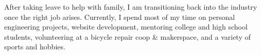\vspace{1ex}
\hfill\begin{minipage}{\dimexpr\textwidth-2ex}
After taking leave to help with family, I am transitioning back into the industry once the right job arises. Currently, I spend most of my time on personal engineering projects, website development, mentoring college and high school students, volunteering at a bicycle repair coop \& makerspace, and a variety of sports and hobbies. 
\end{minipage}